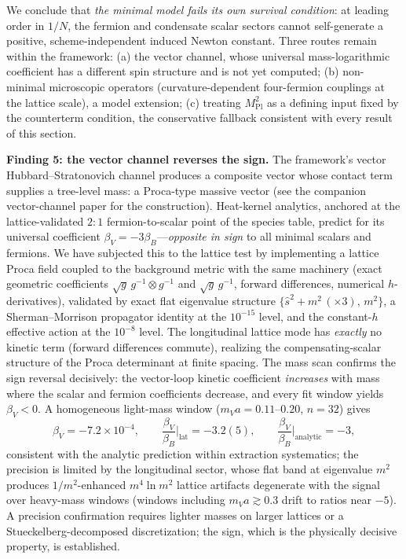 \documentclass[11pt,a4paper]{article}
\begin{document}
We conclude that \emph{the minimal model fails its own survival
condition}: at leading order in $1/N$, the fermion and condensate
scalar sectors cannot self-generate a positive, scheme-independent
induced Newton constant.
Three routes remain within the framework:
(a) the vector channel, whose universal mass-logarithmic
coefficient has a different spin structure and is not yet computed;
(b) non-minimal microscopic operators (curvature-dependent
four-fermion couplings at the lattice scale), a model extension;
(c) treating $M_{\mathrm{Pl}}^2$ as a defining input fixed by the
counterterm condition, the conservative fallback consistent with
every result of this section.

\textbf{Finding 5: the vector channel reverses the sign.}
The framework's vector Hubbard--Stratonovich channel produces a
composite vector whose contact term supplies a tree-level mass: a
Proca-type massive vector (see the companion vector-channel paper
for the construction).
Heat-kernel analytics, anchored at the lattice-validated $2{:}1$
fermion-to-scalar point of the species table, predict for its
universal coefficient
$\beta_V = -3\beta_B$---\emph{opposite in sign} to all minimal
scalars and fermions.
We have subjected this to the lattice test by implementing a
lattice Proca field coupled to the background metric with the same
machinery (exact geometric coefficients
$\sqrt{g}\,g^{-1}\!\otimes g^{-1}$ and $\sqrt{g}\,g^{-1}$, forward
differences, numerical $h$-derivatives), validated by exact flat
eigenvalue structure $\{\hat s^2 + m^2\,(\times 3),\, m^2\}$, a
Sherman--Morrison propagator identity at the $10^{-15}$ level, and
the constant-$h$ effective action at the $10^{-8}$ level.
The longitudinal lattice mode has \emph{exactly} no kinetic term
(forward differences commute), realizing the compensating-scalar
structure of the Proca determinant at finite spacing.
The mass scan confirms the sign reversal decisively: the
vector-loop kinetic coefficient \emph{increases} with mass where
the scalar and fermion coefficients decrease, and every fit window
yields $\beta_V < 0$.
A homogeneous light-mass window ($m_V a = 0.11$--$0.20$, $n=32$)
gives
\begin{equation}
\beta_V = -7.2\times 10^{-4},
\qquad
\frac{\beta_V}{\beta_B}\Big|_{\mathrm{lat}} = -3.2(5),
\qquad
\frac{\beta_V}{\beta_B}\Big|_{\mathrm{analytic}} = -3,
\label{eq:betaVlat}
\end{equation}
consistent with the analytic prediction within extraction
systematics; the precision is limited by the longitudinal sector,
whose flat band at eigenvalue $m^2$ produces $1/m^2$-enhanced
$m^4\ln m^2$ lattice artifacts degenerate with the signal over
heavy-mass windows (windows including $m_V a \gtrsim 0.3$ drift to
ratios near $-5$).
A precision confirmation requires lighter masses on larger
lattices or a Stueckelberg-decomposed discretization; the sign,
which is the physically decisive property, is established.
\end{document}

